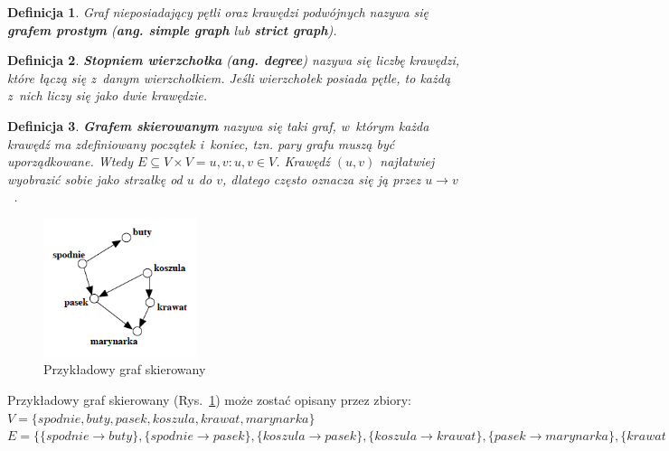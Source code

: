 \documentclass[twoside,12pt]{report}
\newtheorem{definition}{Definicja} %
\begin{document}
\begin{definition}
Graf nieposiadający pętli oraz krawędzi podwójnych nazywa się \textbf{grafem prostym} (\textbf{ang. simple graph} lub \textbf{strict graph}).
\end{definition}

\begin{definition}
\textbf{Stopniem wierzchołka} (\textbf{ang. degree}) nazywa się liczbę krawędzi, które łączą się z~danym wierzchołkiem. Jeśli wierzchołek posiada pętle, to każdą z~nich liczy się jako dwie krawędzie.
\end{definition}

\begin{definition}\label{def:graf_skierowany}
\textbf{Grafem skierowanym} nazywa się taki graf, w~którym każda krawędź ma zdefiniowany początek i~koniec, tzn. pary grafu muszą być uporządkowane. Wtedy $E \subseteq V \times V = {{u,v}:u,v \in V}$.
Krawędź $(u,v)$ najłatwiej wyobrazić sobie jako strzałkę od $u$ do $v$, dlatego często oznacza się ją przez $u \rightarrow v$~\cite{grafy}.
\end{definition}

\begin{figure}[htbp]
\centering
\includegraphics[width=0.40\textwidth]{img/graf2}
\caption{Przykładowy graf skierowany} 
\label{fig:graf_skierowany} 
\end{figure}

Przykładowy graf skierowany (Rys.~\ref{fig:graf_skierowany}) może zostać opisany przez zbiory:
\newline
\begin{math}
V=\{spodnie, buty, pasek, koszula, krawat, marynarka\}
\end{math}
\newline
\begin{math}
E=\{\{spodnie \rightarrow buty\},\{spodnie  \rightarrow pasek\},
	\{koszula \rightarrow pasek\},\{koszula \rightarrow krawat\}, \{pasek \rightarrow marynarka\},\{krawat \rightarrow marynarka\}\}
\end{math}
\end{document}
